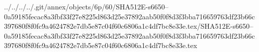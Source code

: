../../../../.git/annex/objects/6p/60/SHA512E-s6650--0a59185fecac8a3fbf33f27e8225d863d25e37892aab50f0f8d3f3bba716659763df23b66c397680f8f0fc9a4624782e7db5e87c04f60c6806a1c4df7bc8e33e.tex/SHA512E-s6650--0a59185fecac8a3fbf33f27e8225d863d25e37892aab50f0f8d3f3bba716659763df23b66c397680f8f0fc9a4624782e7db5e87c04f60c6806a1c4df7bc8e33e.tex